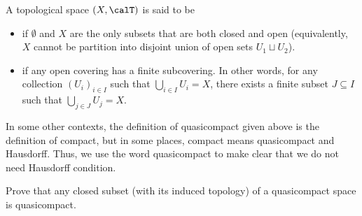 \begin{definition}
\label{def:compact}
A topological space $(X,\calT)$ is said to be 
\begin{itemize}
    \item {} if $\emptyset$ and $X$
    are the only subsets that are both closed and open
    (equivalently, $X$ cannot be partition into 
    disjoint union of open sets $U_1\sqcup U_2$).
    \item {} if any open covering has a finite subcovering. In other words, for any collection $(U_i)_{i\in I}$ such that $\bigcup_{i\in I}U_i=X$,
    there exists a finite subset $J\subseteq I$ such that 
    $\bigcup_{j\in J} U_j = X$.
\end{itemize}
\end{definition}
\begin{remark}
    In some other contexts, the definition of quasicompact 
    given above is the definition of compact,
    but in some places, compact means quasicompact and Hausdorff. Thus, we use the word quasicompact to make clear that we do not need Hausdorff condition.
\end{remark}
\begin{exercise}
    Prove that any closed subset (with its induced topology) of a quasicompact space is quasicompact.
\end{exercise}

